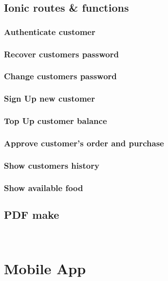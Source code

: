 \begin{figure}
	\subsection{Ionic routes \& functions}
		\subsubsection{Authenticate customer}
		\subsubsection{Recover customers password}
		\subsubsection{Change customers password}
		\subsubsection{Sign Up new customer}
		\subsubsection{Top Up customer balance}
		\subsubsection{Approve customer's order and purchase}
		\subsubsection{Show customers history}
		\subsubsection{Show available food}
	
	

\subsection{PDF make}

~\cite{PDF_Make_module}



  \section{Mobile App}


\end{figure}
